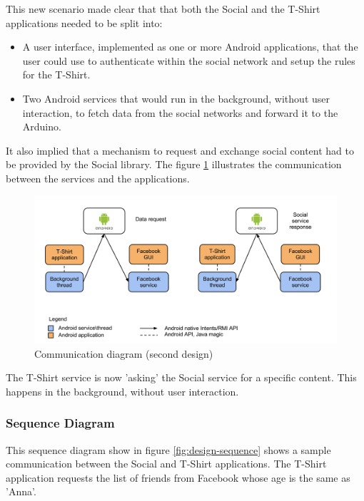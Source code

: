 This new scenario made clear that that both the Social and the T-Shirt applications needed to
be split into:

\begin{itemize}
	\item A user interface, implemented as one or more Android applications, that the user could use to
	authenticate within the social network and setup the rules for the T-Shirt.
	\item Two Android services that would run in the background, without user interaction,
	to fetch data from the social networks and forward it to the Arduino.
\end{itemize}

It also implied that a mechanism to request and exchange social content had to be provided
by the Social library. The figure \ref{fig:design-reqresp} illustrates the communication between
the services and the applications.

\begin{figure}[h!]
	\centering \includegraphics[scale=0.35]{img/design-reqresp.png}
	\caption{Communication diagram (second design)}
	\label{fig:design-reqresp}
\end{figure}

The T-Shirt service is now 'asking' the Social service for a specific content.
This happens in the background, without user interaction.



\subsubsection{Sequence Diagram}
This sequence diagram show in figure \ref{fig:design-sequence} shows a sample communication between the Social and T-Shirt applications.
The T-Shirt application requests the list of friends from Facebook whose age is the same as 'Anna'.

